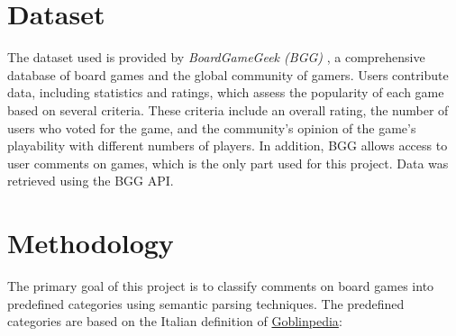 \documentclass[sn-mathphys-num]{sn-jnl}%
\theoremstyle{thmstyleone}%
\theoremstyle{thmstyletwo}%
\theoremstyle{thmstylethree}%
\begin{document}
\section{Dataset}\label{data}
    The dataset used is provided by \textit{BoardGameGeek (BGG)} \cite{BoardGameGeek}, a comprehensive database of board games and the global community of gamers. Users contribute data, including statistics and ratings, which assess the popularity of each game based on several criteria. These criteria include an overall rating, the number of users who voted for the game, and the community's opinion of the game's playability with different numbers of players. In addition, BGG allows access to user comments on games, which is the only part used for this project. Data was retrieved using the BGG API. 

\section{Methodology}\label{meth}
    The primary goal of this project is to classify comments on board games into predefined categories using semantic parsing techniques. The predefined categories are based on the Italian definition of \href{https://www.goblins.net/goblinpedia}{Goblinpedia}: 
\end{document}
